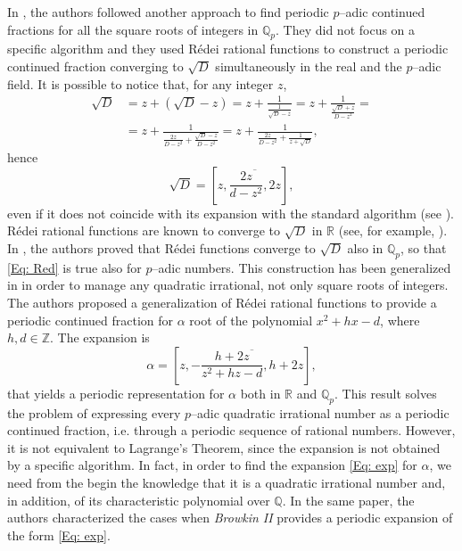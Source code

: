 \documentclass[12pt, reqno]{amsart}
\theoremstyle{plain}
\theoremstyle{definition}
\begin{document}
In \cite{ABCM}, the authors followed another approach to find periodic $p$--adic continued fractions for all the square roots of integers in $\mathbb{Q}_p$. They did not focus on a specific algorithm and they used Rédei rational functions \cite{RED} to construct a periodic continued fraction converging to $\sqrt{D}$ simultaneously in the real and the $p$--adic field. It is possible to notice that, for any integer $z$, 
\begin{align*}
\sqrt{D}&=z+(\sqrt{D}-z)=z+\frac{1}{\frac{1}{\sqrt{D}-z}}=z+\frac{1}{\frac{\sqrt{D}+z}
{D-z^2}}=\\
&=z+\frac{1}{\frac{2z}{D-z^2}+\frac{\sqrt{D}-z}{D-z^2}}=z+\frac{1}{\frac{2z}{D-z^2}+\frac{1}{z+\sqrt{D}}},
\end{align*}
hence
\begin{equation}\label{Eq: Red}
\sqrt{D}=\left[z,\overline{\frac{2z}{d-z^2},2z} \right],
\end{equation}
even if it does not coincide with its expansion with the standard algorithm (see \cite{PER2}). Rédei rational functions are known to converge to $\sqrt{D}$ in $\mathbb{R}$ (see, for example, \cite{DICK}). In \cite{ABCM}, the authors proved that Rédei functions converge to $\sqrt{D}$ also in $\mathbb{Q}_p$, so that \eqref{Eq: Red} is true also for $p$--adic numbers. This construction has been generalized in \cite{BCMI} in order to manage any quadratic irrational, not only square roots of integers. The authors proposed a generalization of Rédei rational functions to provide a periodic continued fraction for $\alpha$ root of the polynomial $x^2+hx-d$, where $h,d\in\mathbb{Z}$. The expansion is
\begin{equation}\label{Eq: exp}
\alpha=\left[z,-\overline{\frac{h+2z}{z^2+hz-d},h+2z}  \right],
\end{equation}
that yields a periodic representation for $\alpha$ both in $\mathbb{R}$ and $\mathbb{Q}_p$. This result solves the problem of expressing every $p$--adic quadratic irrational number as a periodic continued fraction, i.e. through a periodic sequence of rational numbers. However, it is not equivalent to Lagrange's Theorem, since the expansion is not obtained by a specific algorithm. In fact, in order to find the expansion \eqref{Eq: exp} for $\alpha$, we need from the begin the knowledge that it is a quadratic irrational number and, in addition, of its characteristic polynomial over $\mathbb{Q}$. In the same paper, the authors characterized the cases when \textit{Browkin II} provides a periodic expansion of the form \eqref{Eq: exp}.
\end{document}
